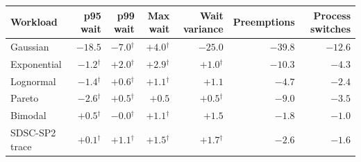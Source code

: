 \begin{tabular}{lrrrrrr}
\toprule
Workload & p95 wait & p99 wait & Max wait & Wait variance & Preemptions & Process switches \\
\midrule
Gaussian & $-18.5$ & $-7.0$$^{\dagger}$ & $+4.0$$^{\dagger}$ & $-25.0$ & $-39.8$ & $-12.6$ \\
Exponential & $-1.2$$^{\dagger}$ & $+2.0$$^{\dagger}$ & $+2.9$$^{\dagger}$ & $+1.0$$^{\dagger}$ & $-10.3$ & $-4.3$ \\
Lognormal & $-1.4$$^{\dagger}$ & $+0.6$$^{\dagger}$ & $+1.1$$^{\dagger}$ & $+1.1$ & $-4.7$ & $-2.4$ \\
Pareto & $-2.6$$^{\dagger}$ & $+0.5$$^{\dagger}$ & $+0.5$ & $+0.5$$^{\dagger}$ & $-9.0$ & $-3.5$ \\
Bimodal & $+0.5$$^{\dagger}$ & $-0.0$$^{\dagger}$ & $+1.1$$^{\dagger}$ & $+1.5$ & $-1.8$ & $-1.0$ \\
SDSC-SP2 trace & $+0.1$$^{\dagger}$ & $+1.1$$^{\dagger}$ & $+1.5$$^{\dagger}$ & $+1.7$$^{\dagger}$ & $-2.6$ & $-1.6$ \\
\bottomrule
\end{tabular}